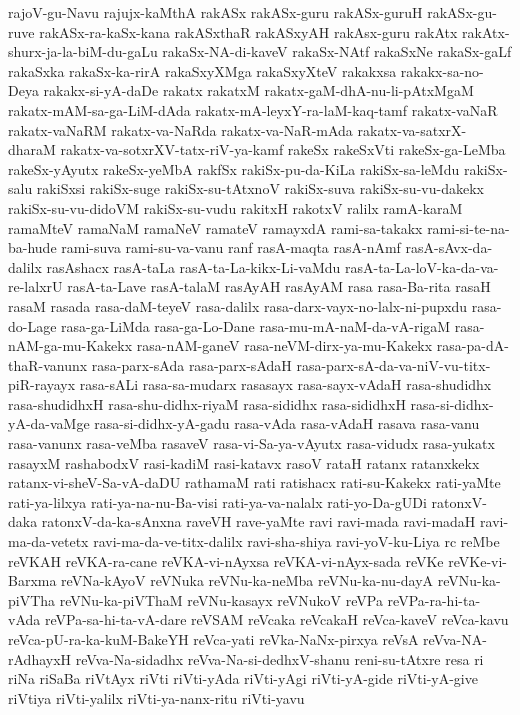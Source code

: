 {rajoV-gu-Navu
rajujx-kaMthA
rakASx
rakASx-guru
rakASx-guruH
rakASx-gu-ruve
rakASx-ra-kaSx-kana
rakASxthaR
rakASxyAH
rakAsx-guru
rakAtx
rakAtx-shurx-ja-la-biM-du-gaLu
rakaSx-NA-di-kaveV
rakaSx-NAtf
rakaSxNe
rakaSx-gaLf
rakaSxka
rakaSx-ka-rirA
rakaSxyXMga
rakaSxyXteV
rakakxsa
rakakx-sa-no-Deya
rakakx-si-yA-daDe
rakatx
rakatxM
rakatx-gaM-dhA-nu-li-pAtxMgaM
rakatx-mAM-sa-ga-LiM-dAda
rakatx-mA-leyxY-ra-laM-kaq-tamf
rakatx-vaNaR
rakatx-vaNaRM
rakatx-va-NaRda
rakatx-va-NaR-mAda
rakatx-va-satxrX-dharaM
rakatx-va-sotxrXV-tatx-riV-ya-kamf
rakeSx
rakeSxVti
rakeSx-ga-LeMba
rakeSx-yAyutx
rakeSx-yeMbA
rakfSx
rakiSx-pu-da-KiLa
rakiSx-sa-leMdu
rakiSx-salu
rakiSxsi
rakiSx-suge
rakiSx-su-tAtxnoV
rakiSx-suva
rakiSx-su-vu-dakekx
rakiSx-su-vu-didoVM
rakiSx-su-vudu
rakitxH
rakotxV
ralilx
ramA-karaM
ramaMteV
ramaNaM
ramaNeV
ramateV
ramayxdA
rami-sa-takakx
rami-si-te-na-ba-hude
rami-suva
rami-su-va-vanu
ranf
rasA-maqta
rasA-nAmf
rasA-sAvx-da-dalilx
rasAshacx
rasA-taLa
rasA-ta-La-kikx-Li-vaMdu
rasA-ta-La-loV-ka-da-va-re-lalxrU
rasA-ta-Lave
rasA-talaM
rasAyAH
rasAyAM
rasa
rasa-Ba-rita
rasaH
rasaM
rasada
rasa-daM-teyeV
rasa-dalilx
rasa-darx-vayx-no-lalx-ni-pupxdu
rasa-do-Lage
rasa-ga-LiMda
rasa-ga-Lo-Dane
rasa-mu-mA-naM-da-vA-rigaM
rasa-nAM-ga-mu-Kakekx
rasa-nAM-ganeV
rasa-neVM-dirx-ya-mu-Kakekx
rasa-pa-dA-thaR-vanunx
rasa-parx-sAda
rasa-parx-sAdaH
rasa-parx-sA-da-va-niV-vu-titx-piR-rayayx
rasa-sALi
rasa-sa-mudarx
rasasayx
rasa-sayx-vAdaH
rasa-shudidhx
rasa-shudidhxH
rasa-shu-didhx-riyaM
rasa-sididhx
rasa-sididhxH
rasa-si-didhx-yA-da-vaMge
rasa-si-didhx-yA-gadu
rasa-vAda
rasa-vAdaH
rasava
rasa-vanu
rasa-vanunx
rasa-veMba
rasaveV
rasa-vi-Sa-ya-vAyutx
rasa-vidudx
rasa-yukatx
rasayxM
rashabodxV
rasi-kadiM
rasi-katavx
rasoV
rataH
ratanx
ratanxkekx
ratanx-vi-sheV-Sa-vA-daDU
rathamaM
rati
ratishacx
rati-su-Kakekx
rati-yaMte
rati-ya-lilxya
rati-ya-na-nu-Ba-visi
rati-ya-va-nalalx
rati-yo-Da-gUDi
ratonxV-daka
ratonxV-da-ka-sAnxna
raveVH
rave-yaMte
ravi
ravi-mada
ravi-madaH
ravi-ma-da-vetetx
ravi-ma-da-ve-titx-dalilx
ravi-sha-shiya
ravi-yoV-ku-Liya
rc
reMbe
reVKAH
reVKA-ra-cane
reVKA-vi-nAyxsa
reVKA-vi-nAyx-sada
reVKe
reVKe-vi-Barxma
reVNa-kAyoV
reVNuka
reVNu-ka-neMba
reVNu-ka-nu-dayA
reVNu-ka-piVTha
reVNu-ka-piVThaM
reVNu-kasayx
reVNukoV
reVPa
reVPa-ra-hi-ta-vAda
reVPa-sa-hi-ta-vA-dare
reVSAM
reVcaka
reVcakaH
reVca-kaveV
reVca-kavu
reVca-pU-ra-ka-kuM-BakeYH
reVca-yati
reVka-NaNx-pirxya
reVsA
reVva-NA-rAdhayxH
reVva-Na-sidadhx
reVva-Na-si-dedhxV-shanu
reni-su-tAtxre
resa
ri
riNa
riSaBa
riVtAyx
riVti
riVti-yAda
riVti-yAgi
riVti-yA-gide
riVti-yA-give
riVtiya
riVti-yalilx
riVti-ya-nanx-ritu
riVti-yavu
}
